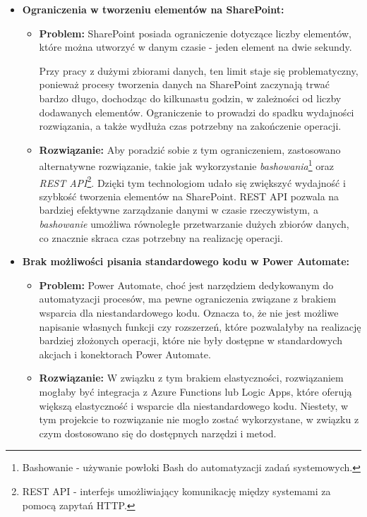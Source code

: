 \begin{itemize}
    \item \textbf{Ograniczenia w tworzeniu elementów na SharePoint:}
          \begin{itemize}
              \item \textbf{Problem:} SharePoint posiada ograniczenie dotyczące liczby elementów, które można utworzyć w danym czasie - jeden element na dwie sekundy.


                    Przy pracy z dużymi zbiorami danych, ten limit staje się problematyczny, ponieważ procesy tworzenia danych na SharePoint zaczynają trwać bardzo długo, dochodząc do kilkunastu godzin, w zależności od liczby dodawanych elementów. Ograniczenie to prowadzi do spadku wydajności rozwiązania, a także wydłuża czas potrzebny na zakończenie operacji.

              \item \textbf{Rozwiązanie:} Aby poradzić sobie z tym ograniczeniem, zastosowano alternatywne rozwiązanie, takie jak wykorzystanie \emph{bashowania}\footnote{Bashowanie - używanie powłoki Bash do automatyzacji zadań systemowych.} oraz \emph{REST API}\footnote{REST API - interfejs umożliwiający komunikację między systemami za pomocą zapytań HTTP.}. Dzięki tym technologiom udało się zwiększyć wydajność i szybkość tworzenia elementów na SharePoint. REST API pozwala na bardziej efektywne zarządzanie danymi w czasie rzeczywistym, a \emph{bashowanie} umożliwa równoległe przetwarzanie dużych zbiorów danych, co znacznie skraca czas potrzebny na realizację operacji.

          \end{itemize}

    \item \textbf{Brak możliwości pisania standardowego kodu w Power Automate:}
          \begin{itemize}
              \item \textbf{Problem:} Power Automate, choć jest narzędziem dedykowanym do automatyzacji procesów, ma pewne ograniczenia związane z brakiem wsparcia dla niestandardowego kodu. Oznacza to, że nie jest możliwe napisanie własnych funkcji czy rozszerzeń, które pozwalałyby na realizację bardziej złożonych operacji, które nie były dostępne w standardowych akcjach i konektorach Power Automate.
              \item \textbf{Rozwiązanie:} W związku z tym brakiem elastyczności, rozwiązaniem mogłaby być integracja z Azure Functions lub Logic Apps, które oferują większą elastyczność i wsparcie dla niestandardowego kodu. Niestety, w tym projekcie to rozwiązanie nie mogło zostać wykorzystane, w związku z czym dostosowano się do dostępnych narzędzi i metod.
          \end{itemize}


\end{itemize}
